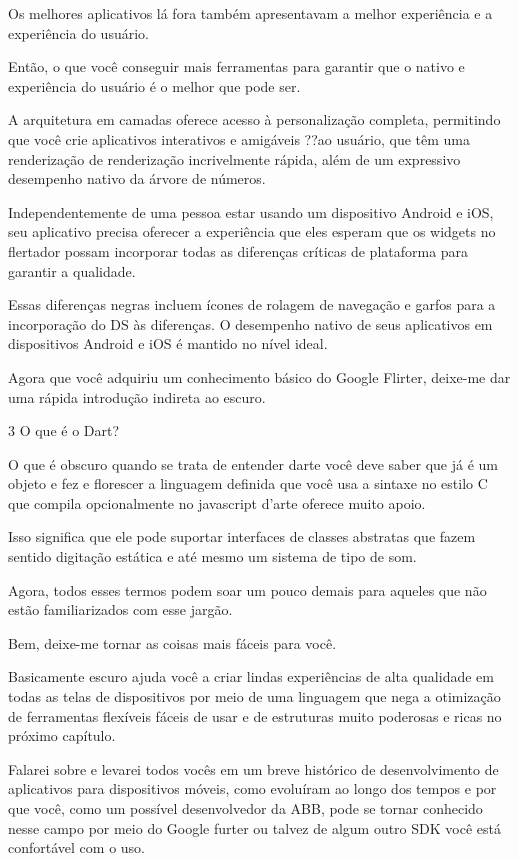 Os melhores aplicativos lá fora também apresentavam a melhor experiência e a experiência do usuário.

Então, o que você conseguir mais ferramentas para garantir que o nativo e experiência do usuário é o melhor que pode ser.

A arquitetura em camadas oferece acesso à personalização completa, permitindo que você crie aplicativos interativos e amigáveis ??ao usuário, que têm uma renderização de renderização incrivelmente rápida, além de um expressivo desempenho nativo da árvore de números.

Independentemente de uma pessoa estar usando um dispositivo Android e iOS, seu aplicativo precisa oferecer a experiência que eles esperam que os widgets no flertador possam incorporar todas as diferenças críticas de plataforma para garantir a qualidade.

Essas diferenças negras incluem ícones de rolagem de navegação e garfos para a incorporação do DS às diferenças. O desempenho nativo de seus aplicativos em dispositivos Android e iOS é mantido no nível ideal.

Agora que você adquiriu um conhecimento básico do Google Flirter, deixe-me dar uma rápida introdução indireta ao escuro.



3 O que é o Dart?

O que é obscuro quando se trata de entender darte você deve saber que já é um objeto e fez e florescer a linguagem definida que você usa a sintaxe no estilo C que compila opcionalmente no javascript d'arte oferece muito apoio.

Isso significa que ele pode suportar interfaces de classes abstratas que fazem sentido digitação estática e até mesmo um sistema de tipo de som.

Agora, todos esses termos podem soar um pouco demais para aqueles que não estão familiarizados com esse jargão.

Bem, deixe-me tornar as coisas mais fáceis para você.

Basicamente escuro ajuda você a criar lindas experiências de alta qualidade em todas as telas de dispositivos por meio de uma linguagem que nega a otimização de ferramentas flexíveis fáceis de usar e de estruturas muito poderosas e ricas no próximo capítulo.

Falarei sobre e levarei todos vocês em um breve histórico de desenvolvimento de aplicativos para dispositivos móveis, como evoluíram ao longo dos tempos e por que você, como um possível desenvolvedor da ABB, pode se tornar conhecido nesse campo por meio do Google furter ou talvez de algum outro SDK você está confortável com o uso.

